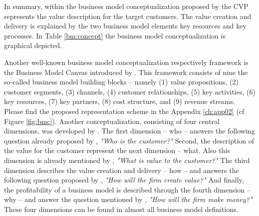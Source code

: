 In summary, within the business model conceptualization proposed by \citet[p. 54]{Johnson2008} the \ac{CVP} represents the value description for the target customers. The value creation and delivery is explained by the two business model elements key resources and key processes. In Table \ref{bm:concept} the business model conceptualization is graphical depicted.

%

Another well-known business model conceptualization respectively framework is the Business Model Canvas introduced by \citet{Osterwalder2010}. This framework consists of nine the so-called business model building blocks -- namely (1) value propositions, (2) customer segments, (3) channels, (4) customer relationships, (5) key activities, (6) key resources, (7) key partners, (8) cost structure, and (9) revenue streams. Please find the proposed representation scheme in the Appendix \ref{ch:app02} (cf. Figure \ref{fig:bmc}). Another conceptualization, consisting of four central dimensions, was developed by \citet{Frankenberger2013}. The first dimension -- who -- answers the following question already proposed by \citet[pp. 49-61]{Drucker1954}, \textit{"Who is the customer?"} Second, the description of the value for the customer represent the next dimension -- what. Also this dimension is already mentioned by \citet[pp. 49-61]{Drucker1954}, \textit{"What is value to the customer?"} The third dimension describes the value creation and delivery -- how -- and answers the following question proposed by \citet[pp. 729-732]{Morris2005}, \textit{"How will the firm create value?"} And finally, the profitability of a business model is described through the fourth dimension -- why -- and answer the question mentioned by \citet[pp. 729-732]{Morris2005}, \textit{"How will the firm make money?"} These four dimensions can be found in almost all business model definitions.

